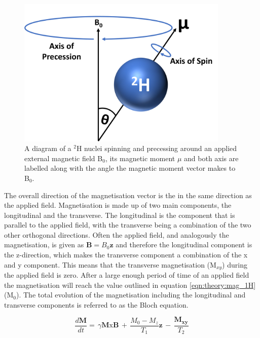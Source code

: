 \documentclass[class=article, crop=false]{standalone}
\begin{document}
\begin{figure}
    \centering
    \includegraphics[width=0.9\textwidth]{Figures/Theory/Moment.png}
    \caption{A diagram of a $^2$H nuclei spinning and precessing around an applied external magnetic field B$_0$, its magnetic moment $\mu$ and both axis are labelled along with the angle the magnetic moment vector makes to B$_0$.}
    \label{fig:theory:moment}
\end{figure}

The overall direction of the magnetisation vector is the in the same direction as the applied field. Magnetisation is made up of two main components, the longitudinal and the transverse. The longitudinal is the component that is parallel to the applied field, with the transverse being a combination of the two other orthogonal directions. Often the applied field, and analogously the magnetisation, is given as $\mathbf{B}=B_0\mathbf{z}$ and therefore the longitudinal component is the z-direction, which makes the transverse component a combination of the x and y component. This means that the transverse magnetisation (M$_{xy}$) during the applied field is zero. After a large enough period of time of an applied field the magnetisation  will reach the value outlined in equation \ref{eqn:theory:mag_1H} (M$_0$). The total evolution of the magnetisation including the longitudinal and transverse components is referred to as the Bloch equation\cite{Bloch1946NuclearInduction}.

\begin{equation}
    \frac{d\mathbf{M}}{dt} = \, \gamma\mathbf{M}\textrm{x}\mathbf{B} \, + \, \frac{M_0-M_z}{T_1}\mathbf{z} \, - \, \frac{\mathbf{M_{xy}}}{T_2}
    \label{eqn:theory:Bloch}
\end{equation}
\end{document}
